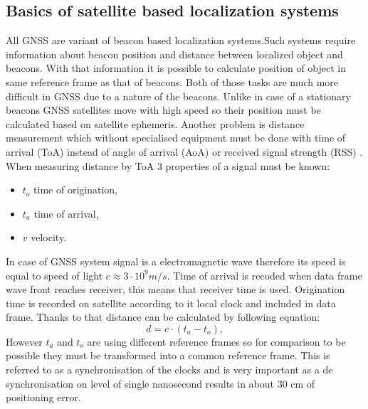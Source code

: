 \documentclass{kybernetika}
\begin{document}
\subsection{Basics of satellite based localization systems}
All GNSS are variant of beacon based localization
systems\cite{Blewitt1997}.Such systems require information about beacon position
and distance between localized object and beacons.
With that information it is possible to calculate position of object in same reference
frame as that of beacons.
Both of those tasks are much more difficult in GNSS due to a nature of the beacons.
Unlike in case of a stationary beacons GNSS satellites move with high speed so
their position must be calculated based on satellite ephemeris\cite{Vallado2008}.
Another problem is distance measurement which without specialised equipment must be
done with time of arrival (ToA) instead of angle of arrival (AoA) or
received signal strength (RSS) \cite{Doberstein2012}.
When measuring distance by ToA  3 properties of a signal must be known:
\begin{itemize}
\item $t_o$ time of origination,
\item $t_a$ time of arrival,
\item $v$ velocity.
\end{itemize}
In case of GNSS system signal is a electromagnetic wave therefore its speed is equal
to speed of light $c\approx 3 \cdot 10^{9} m/s$. Time of arrival is recoded when
data frame wave front reaches receiver, this means that receiver time is used.
Origination time is recorded on satellite according to it local clock and
included in data frame. Thanks to that distance can be calculated by following 
equation:
\begin{equation}
  d=c\cdot (t_a-t_o),
\end{equation}
However $t_a$ and $t_o$ are using different reference frames so for comparison
to be possible they must be transformed into a common reference frame.
This is referred to as a synchronisation of the clocks and is very important as
a de synchronisation on level of single nanosecond results in about 30 cm of
positioning error\cite{Enge2011}.

\end{document}
